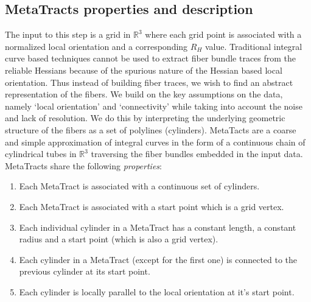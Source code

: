 \subsection {MetaTracts properties and description} 
\label{subsec:mtprop}
The input to this step is a grid in $\mathbb{R}^3$ where each grid point is associated with a normalized local orientation and a corresponding $R_H$ value.
Traditional integral curve based techniques cannot be used to extract fiber bundle traces from the reliable Hessians because of the spurious nature of the Hessian based local orientation. Thus instead of building fiber traces, we wish to find an abstract representation of the fibers. We build on the key assumptions on the data, namely `local orientation' and `connectivity' while taking into account the noise and lack of resolution. We do this by interpreting the underlying geometric structure of the fibers as a set of polylines (cylinders). MetaTacts  are a coarse and simple approximation of integral curves in the form of a continuous chain of cylindrical tubes in $\mathbb{R}^3$ traversing the fiber bundles embedded in the input data. MetaTracts share the following \textit{properties}:

\begin{enumerate}
\item{Each MetaTract is associated with a continuous set of cylinders.}
\item{Each MetaTract is associated with a start point which is a grid vertex.}
\item{Each individual cylinder in a MetaTract has a constant length, a constant radius and a start point (which is also a grid vertex).}
\item{Each cylinder in a MetaTract (except for the first one) is connected to the previous cylinder at its start point.}
\item{Each cylinder is locally parallel to the local orientation at it's start point.}
\end{enumerate}


